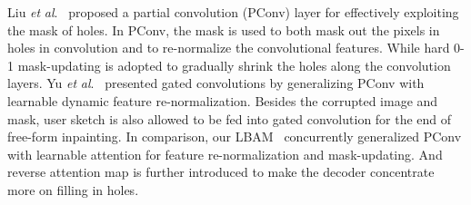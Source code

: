 \documentclass[10pt,journal,compsoc]{IEEEtran}
\newcommand{\etal}{\textit{et} \textit{al}.}
\begin{document}
%
%




Liu \etal~\cite{partialconv2017} proposed a partial convolution (PConv) layer for effectively exploiting the mask of holes.
%
In PConv, the mask is used to both mask out the pixels in holes in convolution and to re-normalize the convolutional features.
%
While hard 0-1 mask-updating is adopted to gradually shrink the holes along the convolution layers.
%
Yu \etal~\cite{yu2018free} presented gated convolutions by generalizing PConv with learnable dynamic feature re-normalization.
%
Besides the corrupted image and mask, user sketch is also allowed to be fed into gated convolution for the end of free-form inpainting.
%
In comparison, our LBAM~\cite{xie2019image} concurrently generalized PConv with learnable attention for feature re-normalization and mask-updating.
%
And reverse attention map is further introduced to make the decoder concentrate more on filling in holes.
\end{document}

